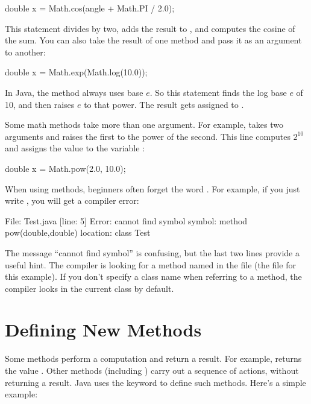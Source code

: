 \begin{code}
double x = Math.cos(angle + Math.PI / 2.0);
\end{code}

This statement divides  by two, adds the result to , and computes the cosine of the sum.
You can also take the result of one method and pass it as an argument to another:

\begin{code}
double x = Math.exp(Math.log(10.0));
\end{code}

In Java, the  method always uses base $e$.
So this statement finds the log base $e$ of 10, and then raises $e$ to that power.
The result gets assigned to .

Some math methods take more than one argument.
For example,  takes two arguments and raises the first to the power of the second.
This line computes $2^{10}$ and assigns the value  to the variable :

\begin{code}
double x = Math.pow(2.0, 10.0);
\end{code}

When using  methods, beginners often forget the word .
For example, if you just write , you will get a compiler error:

\begin{stdout}
File: Test.java  [line: 5]
Error: cannot find symbol
  symbol:   method pow(double,double)
  location: class Test
\end{stdout}

The message ``cannot find symbol'' is confusing, but the last two lines provide a useful hint.
The compiler is looking for a method named  in the file  (the file for this example).
If you don't specify a class name when referring to a method, the compiler looks in the current class by default.


\section{Defining New Methods}
\label{adding_methods}



Some methods perform a computation and return a result.
For example,  returns the value .
Other methods (including ) carry out a sequence of actions, without returning a result.
Java uses the keyword  to define such methods.
Here's a simple example:

